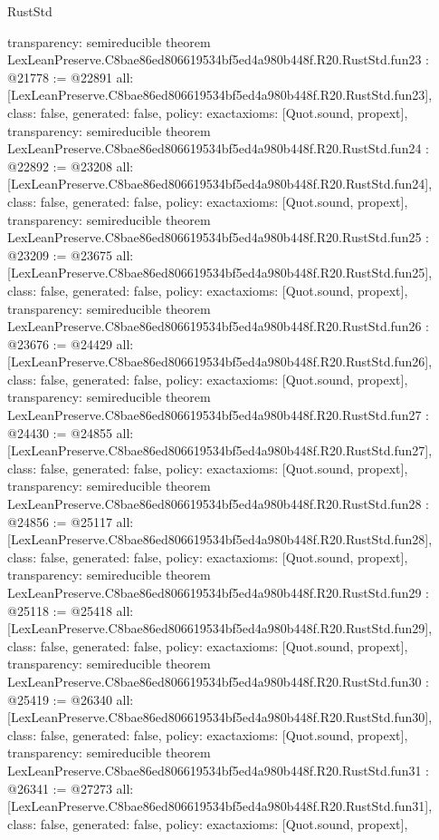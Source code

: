 \begin{lexlean}{RustStd}
\begin{coremodule}
{  transparency: semireducible
}
theorem LexLeanPreserve.C8bae86ed806619534bf5ed4a980b448f.R20.RustStd.fun23 : @21778 := @22891 {
  all: [LexLeanPreserve.C8bae86ed806619534bf5ed4a980b448f.R20.RustStd.fun23],
  class: false,
  generated: false,
  policy: exact{axioms: [Quot.sound, propext]},
  transparency: semireducible
}
theorem LexLeanPreserve.C8bae86ed806619534bf5ed4a980b448f.R20.RustStd.fun24 : @22892 := @23208 {
  all: [LexLeanPreserve.C8bae86ed806619534bf5ed4a980b448f.R20.RustStd.fun24],
  class: false,
  generated: false,
  policy: exact{axioms: [Quot.sound, propext]},
  transparency: semireducible
}
theorem LexLeanPreserve.C8bae86ed806619534bf5ed4a980b448f.R20.RustStd.fun25 : @23209 := @23675 {
  all: [LexLeanPreserve.C8bae86ed806619534bf5ed4a980b448f.R20.RustStd.fun25],
  class: false,
  generated: false,
  policy: exact{axioms: [Quot.sound, propext]},
  transparency: semireducible
}
theorem LexLeanPreserve.C8bae86ed806619534bf5ed4a980b448f.R20.RustStd.fun26 : @23676 := @24429 {
  all: [LexLeanPreserve.C8bae86ed806619534bf5ed4a980b448f.R20.RustStd.fun26],
  class: false,
  generated: false,
  policy: exact{axioms: [Quot.sound, propext]},
  transparency: semireducible
}
theorem LexLeanPreserve.C8bae86ed806619534bf5ed4a980b448f.R20.RustStd.fun27 : @24430 := @24855 {
  all: [LexLeanPreserve.C8bae86ed806619534bf5ed4a980b448f.R20.RustStd.fun27],
  class: false,
  generated: false,
  policy: exact{axioms: [Quot.sound, propext]},
  transparency: semireducible
}
theorem LexLeanPreserve.C8bae86ed806619534bf5ed4a980b448f.R20.RustStd.fun28 : @24856 := @25117 {
  all: [LexLeanPreserve.C8bae86ed806619534bf5ed4a980b448f.R20.RustStd.fun28],
  class: false,
  generated: false,
  policy: exact{axioms: [Quot.sound, propext]},
  transparency: semireducible
}
theorem LexLeanPreserve.C8bae86ed806619534bf5ed4a980b448f.R20.RustStd.fun29 : @25118 := @25418 {
  all: [LexLeanPreserve.C8bae86ed806619534bf5ed4a980b448f.R20.RustStd.fun29],
  class: false,
  generated: false,
  policy: exact{axioms: [Quot.sound, propext]},
  transparency: semireducible
}
theorem LexLeanPreserve.C8bae86ed806619534bf5ed4a980b448f.R20.RustStd.fun30 : @25419 := @26340 {
  all: [LexLeanPreserve.C8bae86ed806619534bf5ed4a980b448f.R20.RustStd.fun30],
  class: false,
  generated: false,
  policy: exact{axioms: [Quot.sound, propext]},
  transparency: semireducible
}
theorem LexLeanPreserve.C8bae86ed806619534bf5ed4a980b448f.R20.RustStd.fun31 : @26341 := @27273 {
  all: [LexLeanPreserve.C8bae86ed806619534bf5ed4a980b448f.R20.RustStd.fun31],
  class: false,
  generated: false,
  policy: exact{axioms: [Quot.sound, propext]},
}
\end{coremodule}
\end{lexlean}
